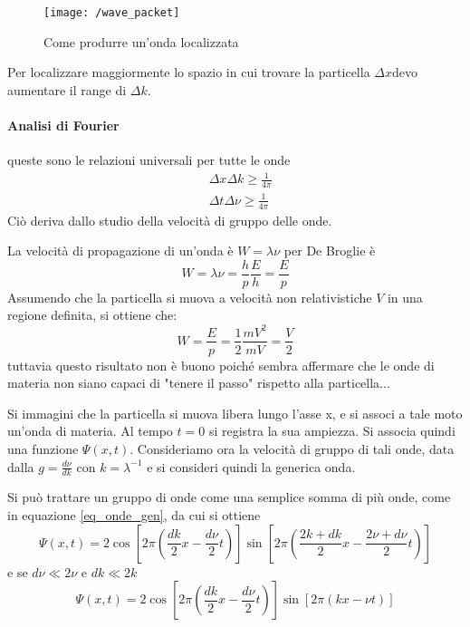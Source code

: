 \begin{figure}[h]
\centering
\texttt{[image: /wave\_packet]}
\caption{Come produrre un'onda localizzata}
\end{figure}

Per localizzare maggiormente lo spazio in cui trovare la particella $\Delta x$devo aumentare il range di $\Delta k$.

\paragraph{Analisi di Fourier} 
queste sono le relazioni universali per tutte le onde
\begin{equation}
\begin{split}
& \Delta x \Delta k \ge \frac{ 1}{4\pi } \\
& \Delta t \Delta \nu \ge \frac{ 1}{4\pi }
\end{split}
\label{eq_univ}
\end{equation}
Ciò deriva dallo studio della velocità di gruppo delle onde.

La velocità di propagazione di un'onda è $W=\lambda \nu$ per De Broglie è $$W = \lambda \nu = \frac{h}{p} \frac{E}{h} = \frac{E}{p}$$
Assumendo che la particella si muova a velocità non relativistiche $V$ in una regione definita, si ottiene che:
\begin{equation}
W = \frac{E}{p} = \frac{1}{2} \frac{m V^2}{m V} = \frac{V}{2}
\end{equation}
tuttavia questo risultato non è buono poiché sembra affermare che le onde di materia non siano capaci di "tenere il passo" rispetto alla particella...

Si immagini che la particella si muova libera lungo l'asse x, e si associ a tale moto un'onda di materia. Al tempo $t=0$ si registra la sua ampiezza.
Si associa quindi una funzione $\Psi (x,t)$.
Consideriamo ora la velocità di gruppo di tali onde, data dalla $g=\frac{d \nu}{d k}$ con $k= \lambda^{-1}$ e si consideri quindi la generica onda.

Si può trattare un gruppo di onde come una semplice somma di più onde, come in equazione \ref{eq_onde_gen}, da cui si ottiene 
\begin{equation}
\Psi (x, t) = 2 \cos [ 2 \pi ( \frac{dk}{2} x - \frac{d\nu}{2} t ) ] \sin [ 2\pi ( \frac{2k + dk}{2} x - \frac{2\nu + d\nu}{2} t ) ]  
\end{equation}
e se $ d\nu \ll 2\nu $ e $ dk \ll 2k $
\begin{equation}
 \Psi (x, t) = 2 \cos [ 2 \pi ( \frac{dk}{2} x - \frac{d\nu}{2} t ) ] \sin [ 2 \pi ( k x - \nu t )] 
\end{equation}

